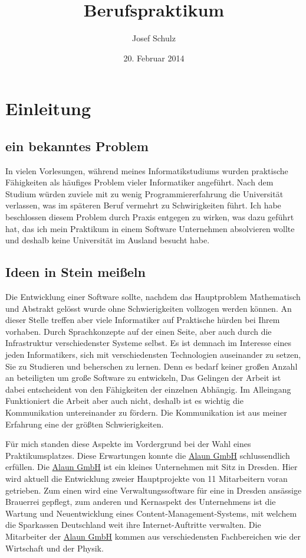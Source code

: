\documentclass{scrartcl}
\title{Berufspraktikum}
\author{Josef Schulz}
\date{20. Februar 2014}
\begin{document}
 
\maketitle
\tableofcontents

\newpage

\section{Einleitung}

\subsection{ein bekanntes Problem}

In vielen Vorlesungen, während meines Informatikstudiums wurden praktische Fähigkeiten als häufiges Problem 
vieler Informatiker angeführt. 
Nach dem Studium würden zuviele mit zu wenig Programmiererfahrung die Universität verlassen, was im späteren
Beruf vermehrt zu Schwirigkeiten führt. Ich habe beschlossen diesem Problem durch Praxis entgegen zu wirken,
was dazu geführt hat, das ich mein Praktikum in einem Software Unternehmen absolvieren wollte und deshalb
keine Universität im Ausland besucht habe.

\subsection{Ideen in Stein meißeln}

Die Entwicklung einer Software sollte, nachdem das Hauptproblem Mathematisch und Abstrakt gelösst wurde ohne
Schwierigkeiten vollzogen werden können. An dieser Stelle treffen aber viele Informatiker auf Praktische
hürden bei Ihrem vorhaben. Durch Sprachkonzepte auf der einen Seite, aber auch durch die Infrastruktur
verschiedenster Systeme selbst.
Es ist demnach im Interesse eines jeden Informatikers, sich mit verschiedensten Technologien auseinander zu
setzen, Sie zu Studieren und beherschen zu lernen.
Denn es bedarf keiner großen Anzahl an beteiligten um große Software zu entwickeln, Das Gelingen der Arbeit ist dabei
entscheident von den Fähigkeiten der einzelnen Abhängig.
Im Alleingang Funktioniert die Arbeit aber auch nicht, deshalb ist es wichtig die Kommunikation untereinander zu fördern.
Die Kommunikation ist aus meiner Erfahrung eine der größten Schwierigkeiten.

Für mich standen diese Aspekte im Vordergrund bei der Wahl eines Praktikumsplatzes.
Diese Erwartungen konnte die \href{https://alaun.de/home/}{Alaun GmbH} schlussendlich erfüllen. 
Die \href{https://alaun.de/home/}{Alaun GmbH} ist ein kleines Unternehmen mit Sitz in Dresden. 
Hier wird aktuell die Entwicklung zweier Hauptprojekte von 11 Mitarbeitern voran getrieben.
Zum einen wird eine Verwaltungssoftware für eine in Dresden ansässige Brauerrei gepflegt,
zum anderen und Kernaspekt des Unternehmens ist die Wartung und Neuentwicklung eines Content-Management-Systems,
mit welchem die Sparkassen Deutschland weit ihre Internet-Auftritte verwalten.
Die Mitarbeiter der \href{https://alaun.de/home/}{Alaun GmbH} kommen aus verschiedensten Fachbereichen wie der Wirtschaft
und der Physik.
\end{document}
